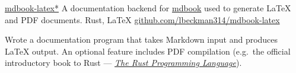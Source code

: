 \showoff
{\textcolor{my-blue}{\href{https://liambeckman.com/mdbook-latex}{mdbook-latex*}}}
{A documentation backend for \textcolor{my-blue}{\href{https://github.com/rust-lang/mdBook}{mdbook}} used to generate \LaTeX{} and PDF documents.}
{Rust, \LaTeX{}}
{\textcolor{my-blue}{\href{https://github.com/lbeckman314/mdbook-latex}{github.com/lbeckman314/mdbook-latex}}}

Wrote a documentation program that takes Markdown input and produces \LaTeX{} output. An optional feature includes PDF compilation (e.g.\ the official introductory book to Rust --- \textcolor{my-blue}{\href{https://github.com/lbeckman314/mdbook-latex/releases/latest/download/The.Rust.Programming.Language.pdf}{\emph{The Rust Programming Language}}}).

